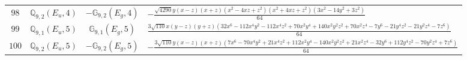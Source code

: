 \documentclass[fleqn,8pt,landscape]{jsarticle}
\begin{document}
\begin{table}[ht!]
\begin{center}
\begin{tabular}{cccl}
$ 98 $ & $ \mathbb{Q}_{9,2}(E_{u},4) $ & $ -\mathbb{G}_{9,2}(E_{g},4) $ & $ - \frac{\sqrt{4290} y \left(x - z\right) \left(x + z\right) \left(x^{2} - 4 x z + z^{2}\right) \left(x^{2} + 4 x z + z^{2}\right) \left(3 x^{2} - 14 y^{2} + 3 z^{2}\right)}{64} $ \\
$ 99 $ & $ \mathbb{Q}_{9,1}(E_{u},5) $ & $ \mathbb{G}_{9,1}(E_{g},5) $ & $ \frac{3 \sqrt{110} x \left(y - z\right) \left(y + z\right) \left(32 x^{6} - 112 x^{4} y^{2} - 112 x^{4} z^{2} + 70 x^{2} y^{4} + 140 x^{2} y^{2} z^{2} + 70 x^{2} z^{4} - 7 y^{6} - 21 y^{4} z^{2} - 21 y^{2} z^{4} - 7 z^{6}\right)}{64} $ \\
$ 100 $ & $ \mathbb{Q}_{9,2}(E_{u},5) $ & $ -\mathbb{G}_{9,2}(E_{g},5) $ & $ - \frac{3 \sqrt{110} y \left(x - z\right) \left(x + z\right) \left(7 x^{6} - 70 x^{4} y^{2} + 21 x^{4} z^{2} + 112 x^{2} y^{4} - 140 x^{2} y^{2} z^{2} + 21 x^{2} z^{4} - 32 y^{6} + 112 y^{4} z^{2} - 70 y^{2} z^{4} + 7 z^{6}\right)}{64} $ \\
 \hline \hline
\end{tabular}
\end{center}
\end{table}
\end{document}

